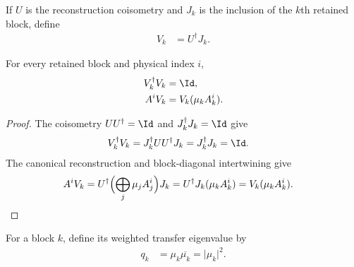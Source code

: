 \begin{definition}
    \label{def:mpu_ambient_block_inclusion}
    \leanok
    If $U$ is the reconstruction coisometry and $J_k$ is the inclusion of the
    $k$th retained block, define
    \begin{align}
        V_k & =U^\dagger J_k.
    \end{align}
\end{definition}

\begin{lemma}
    \label{thm:mpu_ambient_block_isometry_intertwining}
    \leanok
    For every retained block and physical index $i$,
    \begin{align}
        V_k^\dagger V_k & =\Id,              \\
        A^iV_k          & =V_k(\mu_k A_k^i).
    \end{align}
\end{lemma}

\begin{proof}\leanok
    The coisometry $UU^\dagger=\Id$ and $J_k^\dagger J_k=\Id$ give
    \begin{align}
        V_k^\dagger V_k
         & =J_k^\dagger UU^\dagger J_k
        =J_k^\dagger J_k
        =\Id.
    \end{align}
    The canonical reconstruction and block-diagonal intertwining give
    \begin{align}
        A^iV_k
         & =U^\dagger\Bigl(\bigoplus_j\mu_jA_j^i\Bigr)J_k
        =U^\dagger J_k(\mu_kA_k^i)
        =V_k(\mu_kA_k^i).
    \end{align}
\end{proof}

\begin{definition}
    \label{def:mpu_transfer_eigenvalue}
    \leanok
    For a block $k$, define its weighted transfer eigenvalue by
    \begin{align}
        q_k & =\mu_k\overline{\mu_k}=\lvert\mu_k\rvert^2.
    \end{align}
\end{definition}

